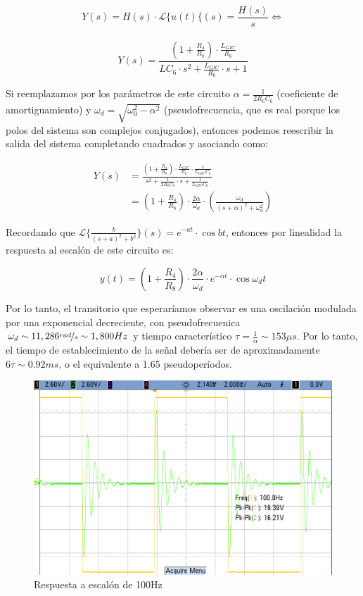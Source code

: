 \documentclass[../../tc_tp3_main.tex]{subfiles}
\begin{document}
\[	Y(s) = H(s) \cdot \mathcal{L}\{u(t)\{(s) = \frac{H(s)}{s} \Leftrightarrow\]\\
\[	Y(s) =  \frac{\left( 1+\frac{R_4}{R_8} \right) \cdot \frac{L_{GIC}}{R_6}}{ LC_6 \cdot s^2  + \frac{L_{GIC}}{R_6} \cdot s + 1} \]

Si reemplazamos por los par\'ametros de este circuito $\alpha = \frac{1}{2R_6 C_6}$ (coeficiente de amortiguamiento) y $\omega_d = \sqrt{\omega_0^2 - \alpha^2}$ (pseudofrecuencia, que es real porque los polos del sistema son complejos conjugados), entonces podemos reescribir la salida del sistema completando cuadrados y asociando como:\par

\[
	\begin{aligned} 
	Y(s) &= \frac{ \left( 1+\frac{R_4}{R_8} \right) \cdot \frac{L_{GIC}}{R_6} \cdot \frac{1}{L_{GIC}C_6} }{s^2  + \frac{1}{2R_6 C_6} \cdot s + \frac{1}{L_{GIC}C_6}} \\
	 &= \left( 1+\frac{R_4}{R_8} \right) \cdot \frac{2\alpha}{\omega_d} \cdot \left( \frac{\omega_d}{(s+\alpha)^2 + \omega_d^2} \right)
	 \end{aligned}
\]

Recordando que $\mathcal{L}\{ \frac{b}{(s+a)^2+b^2} \}(s) = e^{-at}\cdot \cos{bt}$, entonces por linealidad la respuesta al escal\'on de este circuito es:

\begin{equation}
	y(t) = \left(1+\frac{R_4}{R_8} \right) \cdot \frac{2\alpha}{\omega_d} \cdot e^{-\alpha t}\cdot \cos{\omega_d t}
\end{equation} 

Por lo tanto, el transitorio que esperar\'iamos observar es una oscilaci\'on modulada por una exponencial decreciente, con pseudofrecuenica $\omega_d \sim 11,286 \nicefrac{rad}{s} \sim 1,800Hz$ y tiempo caracter\'istico $\tau = \frac{1}{\alpha} \sim 153\mu s$. Por lo tanto, el tiempo de establecimiento de la se\~nal deber\'ia ser de aproximadamente $6\tau \sim 0.92ms$, o el equivalente a 1.65 pseudoper\'iodos.

\begin{figure}[H]
	\centering
  	\includegraphics[scale = 0.3]{imagenes/tc_tp3_ej1_100Hz.png}
  	\caption{Respuesta a escal\'on de 100Hz}
  	\label{fig:1-rtaesc-100Hz}
\end{figure}
\end{document}
